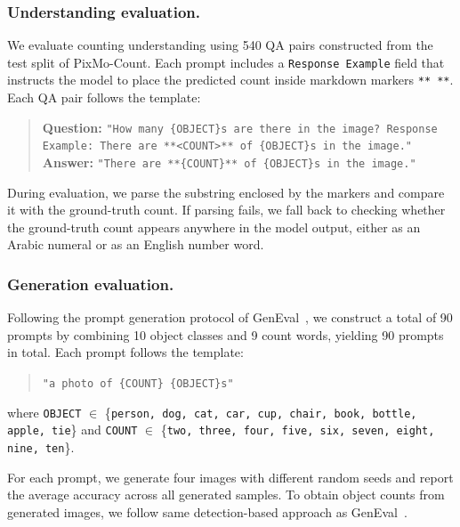 \subsubsection{Understanding evaluation.}
We evaluate counting understanding using 540 QA pairs constructed from 
the test split of PixMo-Count. Each prompt includes a \texttt{Response Example} 
field that instructs the model to place the predicted count inside markdown 
markers \texttt{** **}. Each QA pair follows the template:
\begin{quote}
\textbf{Question:} \texttt{"How many \{OBJECT\}s are there in the image? Response Example: There are **<COUNT>** of \{OBJECT\}s in the image."} \\
\textbf{Answer:} \texttt{"There are **\{COUNT\}** of \{OBJECT\}s in the image."}
\end{quote}
\noindent During evaluation, we parse the substring enclosed by the markers 
and compare it with the ground-truth count. If parsing fails, we fall back 
to checking whether the ground-truth count appears anywhere in the model 
output, either as an Arabic numeral or as an English number word.

\subsubsection{Generation evaluation.} 
Following the prompt generation protocol of GenEval~\cite{ghosh2023geneval}, 
we construct a total of 90 prompts by combining 10 object classes 
and 9 count words, yielding 90 prompts in total. 
Each prompt follows the template:

\begin{quote}
\texttt{"a photo of \{COUNT\} \{OBJECT\}s"}
\end{quote}

\noindent where \texttt{OBJECT} $\in$ \{\texttt{person, dog, cat, car, 
cup, chair, book, bottle, apple, tie}\} and \texttt{COUNT} $\in$ 
\{\texttt{two, three, four, five, six, seven, eight, nine, ten}\}.

For each prompt, we generate four images with different random seeds 
and report the average accuracy across all generated samples.
To obtain object counts from generated images, we follow same detection-based approach as GenEval~\cite{ghosh2023geneval}.

